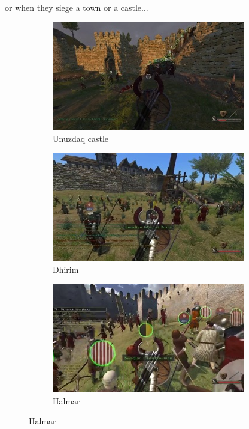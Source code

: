 \documentclass[
]{article}
\begin{document}
or when they siege a town or a castle...

\begin{figure}[H]
	\centering
	\begin{subfigure}[b]{0.3\textwidth}
		\includegraphics[width=\linewidth]{docimages/E_0068_00_48_04.jpg}
		\caption{Unuzdaq castle}
	\end{subfigure}
	\begin{subfigure}[b]{0.3\textwidth}
		\includegraphics[width=\linewidth]{docimages/E_0068_00_20_08.jpg}
		\caption{Dhirim}
	\end{subfigure}
	\begin{subfigure}[b]{0.3\textwidth}
		\includegraphics[width=\linewidth]{docimages/E_0075_00_25_50.jpg}
		\caption{Halmar}
	\end{subfigure}
\end{figure}
\end{document}

